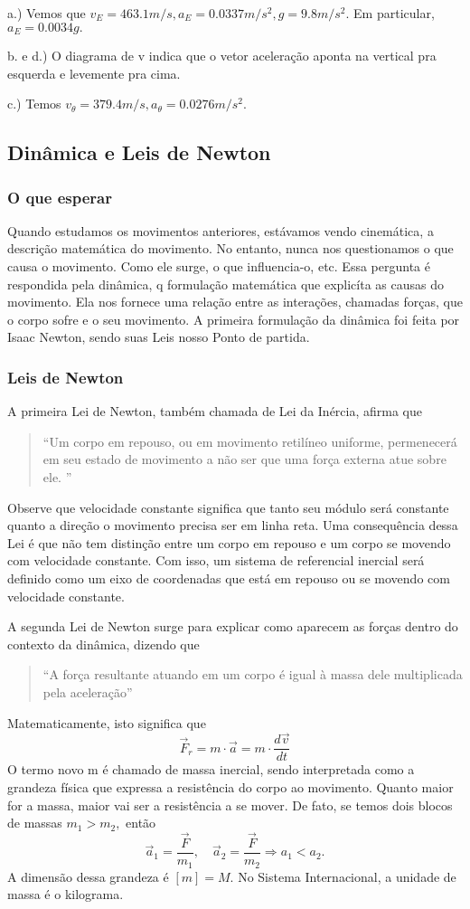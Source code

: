 \documentclass[physics_notes.tex]{subfiles}
\begin{document}
a.) Vemos que $v_{E} = 463.1m/s, a_{E} = 0.0337m/s^{2}, g = 9.8m/s^{2}$. Em particular, $a_{E} = 0.0034g.$

b. e d.) O diagrama de v indica que o vetor aceleração aponta na vertical pra esquerda e levemente pra cima.

c.) Temos $v_{\theta} = 379.4m/s, a_{\theta}=0.0276m/s^{2}.$

\subsection{Dinâmica e Leis de Newton}
\subsubsection{O que esperar}
Quando estudamos os movimentos anteriores, estávamos vendo cinemática, a descrição matemática do movimento. No entanto,
nunca nos questionamos o que causa o movimento. Como ele surge, o que influencia-o, etc. Essa pergunta é respondida pela dinâmica,
q formulação matemática que explicíta as causas do movimento. Ela nos fornece uma relação entre as interações, chamadas forças,
que o corpo sofre e o seu movimento. A primeira formulação da dinâmica foi feita por Isaac Newton, sendo suas Leis nosso Ponto de partida.

\subsubsection{Leis de Newton}
A primeira Lei de Newton, também chamada de Lei da Inércia, afirma que
\begin{quote}
	``Um corpo em repouso, ou em movimento retilíneo uniforme, permenecerá em seu estado de movimento a não ser que uma
	força externa atue sobre ele. ''
\end{quote}
Observe que velocidade constante significa que tanto seu módulo será constante quanto a direção o movimento precisa ser em linha reta.
Uma consequência dessa Lei é que não tem distinção entre um corpo em repouso e um corpo se movendo com velocidade constante.
Com isso, um sistema de referencial inercial será definido como um eixo de coordenadas que está em repouso ou se movendo com
velocidade constante.

A segunda Lei de Newton surge para explicar como aparecem as forças dentro do contexto da dinâmica, dizendo que
\begin{quote}
	``A força resultante atuando em um corpo é igual à massa dele multiplicada pela aceleração''
\end{quote}
Matematicamente, isto significa que
$$
	\boxed{\vec{F}_{r} = m \cdot \vec{a} = m \cdot \frac{d \vec{v}}{dt}}
$$
O termo novo m é chamado de massa inercial, sendo interpretada como a grandeza física que expressa a resistência do corpo
ao movimento. Quanto maior for a massa, maior vai ser a resistência a se mover. De fato, se temos dois blocos de massas $m_{1}>m_{2},$ então
$$
	\vec{a}_{1} = \frac{\vec{F}}{m_{1}},\quad \vec{a}_{2} = \frac{\vec{F}}{m_{2}} \Rightarrow a_{1} < a_{2}.
$$
A dimensão dessa grandeza é $[m] = M$. No Sistema Internacional, a unidade de massa é o kilograma.
\end{document}
